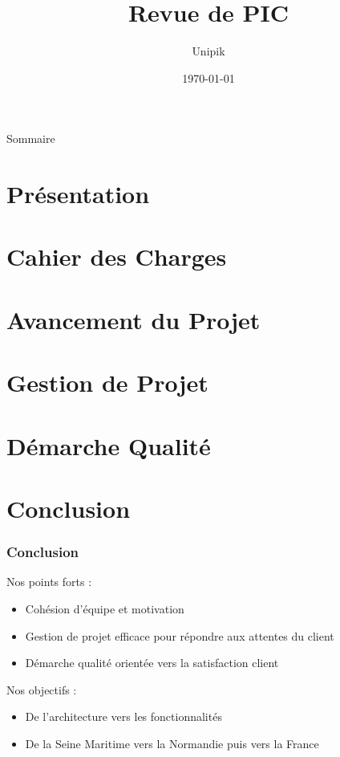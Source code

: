 \documentclass[compress,xcolor=dvipsnames]{beamer}
\title{Revue de PIC}
\date{\today}
\author{Unipik}
\institute{\insa}
\begin{document}
\speaker{\Sergi} 

\begin{frame}[plain]
	\titlepage
\end{frame}

\begin{frame}{Sommaire}
	\tableofcontents[hideallsubsections]
\end{frame}
 

\speaker{\Sergi}
\section[Présentation]{Présentation}



\section[Cahier des charges]{Cahier des Charges}


\speaker{\Sergi}
\section[Avancement]{Avancement du Projet}


\speaker{\Sergi}
\section[Gestion projet]{Gestion de Projet}



\speaker{\Sergi}
\section[Qualité]{Démarche Qualité}


\speaker{\Sergi}
\section[Conclusion]{Conclusion}
\begin{frame}
\frametitle{Conclusion}
Nos points forts :
\begin{itemize}
 \item Cohésion d'équipe et motivation
 \item Gestion de projet efficace pour répondre aux attentes du client
 \item Démarche qualité orientée vers la satisfaction client
\end{itemize}
Nos objectifs :
\begin{itemize} 
 \item De l'architecture vers les fonctionnalités
 \item De la Seine Maritime vers la Normandie puis vers la France
\end{itemize}
\end{frame}
\end{document}
